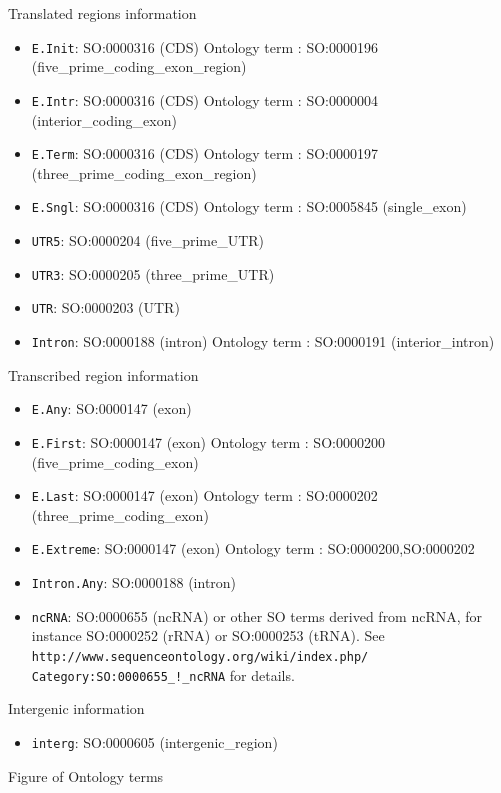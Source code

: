 Translated regions information
\begin{itemize}
\item \texttt{E.Init}: SO:0000316 (CDS) Ontology term :	SO:0000196 (five\_prime\_coding\_exon\_region)
\item \texttt{E.Intr}: SO:0000316 (CDS) Ontology term :	SO:0000004 (interior\_coding\_exon)
\item \texttt{E.Term}: SO:0000316 (CDS) Ontology term :	SO:0000197 (three\_prime\_coding\_exon\_region)
\item \texttt{E.Sngl}: SO:0000316 (CDS) Ontology term :	SO:0005845 (single\_exon)
\item \texttt{UTR5}:   SO:0000204 (five\_prime\_UTR)
\item \texttt{UTR3}:   SO:0000205 (three\_prime\_UTR)
\item \texttt{UTR}:    SO:0000203 (UTR)
\item \texttt{Intron}: SO:0000188 (intron) Ontology term : SO:0000191	(interior\_intron)
\end{itemize}

Transcribed region information
\begin{itemize}
\item \texttt{E.Any}: 		SO:0000147 (exon)
\item \texttt{E.First}: 	SO:0000147 (exon)	Ontology term :	SO:0000200 (five\_prime\_coding\_exon)
\item \texttt{E.Last}: 		SO:0000147 (exon)	Ontology term :	SO:0000202 (three\_prime\_coding\_exon)
\item \texttt{E.Extreme}: 	SO:0000147 (exon)	Ontology term :	SO:0000200,SO:0000202
\item \texttt{Intron.Any}: 	SO:0000188 (intron)
\item \texttt{ncRNA}: 	        SO:0000655 (ncRNA) or other SO terms derived from ncRNA, for instance SO:0000252 (rRNA) or SO:0000253 (tRNA). 
See  \texttt{http://www.sequenceontology.org/wiki/index.php/} \texttt{Category:SO:0000655\_!\_ncRNA} for details.

\end{itemize}

Intergenic information
\begin{itemize}
\item \texttt{interg}: SO:0000605 (intergenic\_region)
\end{itemize}

Figure of Ontology terms

